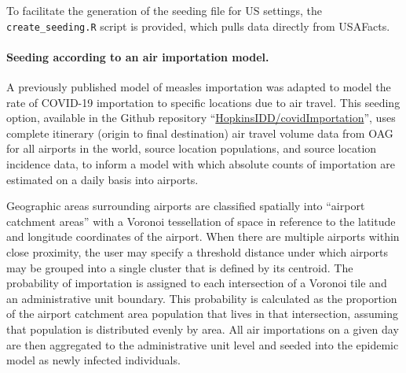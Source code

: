 To facilitate the generation of the seeding file for US settings, the \verb|create_seeding.R| script is provided, which pulls data directly from USAFacts. 

\paragraph{Seeding according to an air importation model.} A previously published model of measles importation was adapted to model the rate of COVID-19 importation to specific locations due to air travel\cite{Truelove:EpidemicsAirTravel:2020}. This seeding option, available in the Github repository “\url{HopkinsIDD/covidImportation}”\cite{Truelove:HopkinsIDDCovidImportationInitial:2020}, uses complete itinerary (origin to final destination) air travel volume data from OAG\cite{OAG:FlightDataOAG:2020} for all airports in the world, source location populations, and source location incidence data, to inform a model with which absolute counts of importation are estimated on a daily basis into airports. 

Geographic areas surrounding airports are classified spatially into “airport catchment areas” with a Voronoi tessellation of space in reference to the latitude and longitude coordinates of the airport\cite{Balcan:ModelingSpatialSpread:2010}. When there are multiple airports within close proximity, the user may specify a threshold distance under which airports may be grouped into a single cluster that is defined by its centroid. The probability of importation is assigned to each intersection of a Voronoi tile and an administrative unit boundary. This probability is calculated as the proportion of the airport catchment area population that lives in that intersection, assuming that population is distributed evenly by area. All air importations on a given day are then aggregated to the administrative unit level and seeded into the epidemic model as newly infected individuals.

